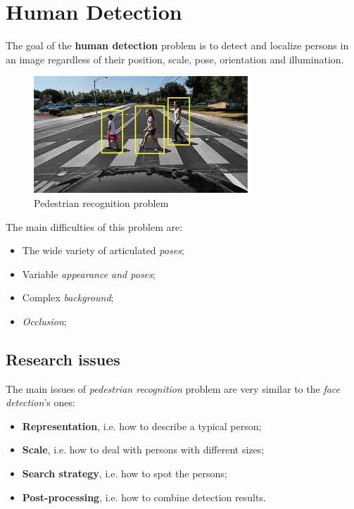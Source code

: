 \section{Human Detection} \label{ch3}
The goal of the \textbf{human detection} problem is to detect and localize persons in an image regardless of their position, scale, pose, orientation and illumination.

\begin{figure}[h!]
		\centering
		\includegraphics[scale = 0.7]{img/pedestrian recognition.jpeg}
        \caption{Pedestrian recognition problem}
\end{figure}

The main difficulties of this problem are:

\begin{itemize}
    \item The wide variety of articulated \textit{poses};
    \item Variable \textit{appearance and poses};
    \item Complex \textit{background};
    \item \textit{Occlusion};
\end{itemize}

\subsection{Research issues}
The main issues of \textit{pedestrian recognition} problem are very similar to the \textit{face detection}'s ones:

\begin{itemize}
    \item \textbf{Representation}, i.e. how to describe a typical person;
    \item \textbf{Scale}, i.e. how to deal with persons with different sizes;
    \item \textbf{Search strategy}, i.e. how to spot the persons;
    \item \textbf{Post-processing}, i.e. how to combine detection results.
\end{itemize}

